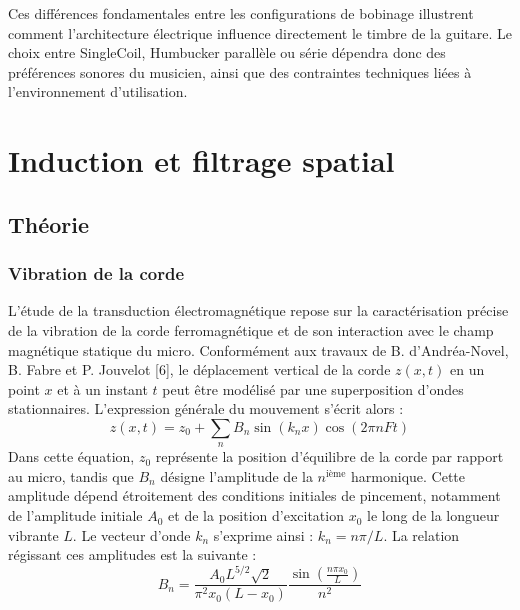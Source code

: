 \documentclass[11pt, a4paper]{article}
\begin{document}
Ces différences fondamentales entre les configurations de bobinage illustrent comment l'architecture électrique influence directement le timbre de la guitare. Le choix entre SingleCoil, Humbucker parallèle ou série dépendra donc des préférences sonores du musicien, ainsi que des contraintes techniques liées à l'environnement d'utilisation.

\newpage
\section{Induction et filtrage spatial}

\subsection{Théorie}
\subsubsection{Vibration de la corde}
L'étude de la transduction électromagnétique repose sur la caractérisation précise de la vibration de la corde ferromagnétique et de son interaction avec le champ magnétique statique du micro. Conformément aux travaux de B. d'Andréa-Novel, B. Fabre et P. Jouvelot [6], le déplacement vertical de la corde $z(x,t)$ en un point $x$ et à un instant $t$ peut être modélisé par une superposition d'ondes stationnaires. L'expression générale du mouvement s'écrit alors :
\begin{equation}
z(x,t) = z_0 + \sum_{n} B_n \sin(k_n x) \cos(2\pi n F t)
\end{equation}
Dans cette équation, $z_0$ représente la position d'équilibre de la corde par rapport au micro, tandis que $B_n$ désigne l'amplitude de la $n^{\text{ième}}$ harmonique. Cette amplitude dépend étroitement des conditions initiales de pincement, notamment de l'amplitude initiale $A_0$ et de la position d'excitation $x_0$ le long de la longueur vibrante $L$. Le vecteur d'onde $k_n$ s'exprime ainsi : $k_n = n\pi/L$. La relation régissant ces amplitudes est la suivante :
\begin{equation}
B_n = \frac{A_0 L^{5/2} \sqrt{2}}{\pi^2 x_0 (L - x_0)} \frac{\sin\left(\frac{n\pi x_0}{L}\right)}{n^2}
\end{equation}
\end{document}
